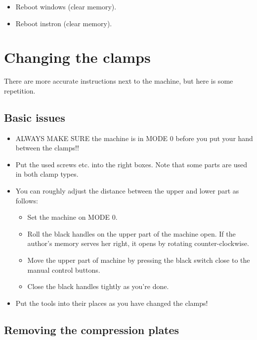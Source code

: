 \documentclass[a4paper]{article}
\begin{document}
\begin{itemize}
  \item Reboot windows (clear memory).
  \item Reboot instron (clear memory).
\end{itemize}

\section{Changing the clamps}

There are more accurate instructions next to the machine, but here is some repetition. 

\subsection{Basic issues}

\begin{itemize}
  \item ALWAYS MAKE SURE the machine is in \textsf{MODE 0} before you put your hand between the clamps!!
  \item Put the used screws etc. into the right boxes. Note that some parts are used in both clamp types.
  \item You can roughly adjust the distance between the upper and lower part as follows:
  \begin{itemize}
    \item Set the machine on \textsf{MODE 0}.
    \item Roll the black handles on the upper part of the machine open. If the author's memory serves her right, it opens by rotating counter-clockwise.
    \item Move the upper part of machine by pressing the black switch close to the manual control buttons.
    \item Close the black handles tightly as you're done.
  \end{itemize}
  \item Put the tools into their places as you have changed the clamps!
\end{itemize}

\subsection{Removing the compression plates}
\end{document}
